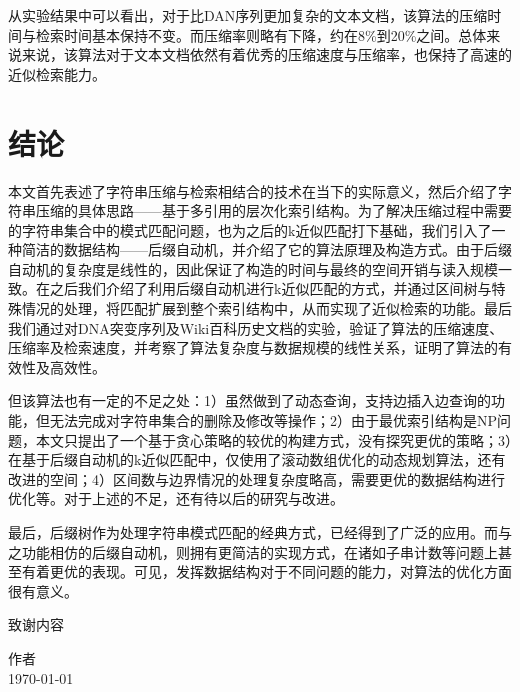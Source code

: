 ﻿\documentclass{sysuthesis}
\begin{document}
从实验结果中可以看出，对于比DAN序列更加复杂的文本文档，该算法的压缩时间与检索时间基本保持不变。而压缩率则略有下降，约在8\%到20\%之间。总体来说来说，该算法对于文本文档依然有着优秀的压缩速度与压缩率，也保持了高速的近似检索能力。



\chapter{结论}
本文首先表述了字符串压缩与检索相结合的技术在当下的实际意义，然后介绍了字符串压缩的具体思路——基于多引用的层次化索引结构。为了解决压缩过程中需要的字符串集合中的模式匹配问题，也为之后的k近似匹配打下基础，我们引入了一种简洁的数据结构——后缀自动机，并介绍了它的算法原理及构造方式。由于后缀自动机的复杂度是线性的，因此保证了构造的时间与最终的空间开销与读入规模一致。在之后我们介绍了利用后缀自动机进行k近似匹配的方式，并通过区间树与特殊情况的处理，将匹配扩展到整个索引结构中，从而实现了近似检索的功能。最后我们通过对DNA突变序列及Wiki百科历史文档的实验，验证了算法的压缩速度、压缩率及检索速度，并考察了算法复杂度与数据规模的线性关系，证明了算法的有效性及高效性。\par
但该算法也有一定的不足之处：1）虽然做到了动态查询，支持边插入边查询的功能，但无法完成对字符串集合的删除及修改等操作；2）由于最优索引结构是NP问题，本文只提出了一个基于贪心策略的较优的构建方式，没有探究更优的策略；3）在基于后缀自动机的k近似匹配中，仅使用了滚动数组优化的动态规划算法，还有改进的空间；4）区间数与边界情况的处理复杂度略高，需要更优的数据结构进行优化等。对于上述的不足，还有待以后的研究与改进。\par
最后，后缀树作为处理字符串模式匹配的经典方式，已经得到了广泛的应用。而与之功能相仿的后缀自动机，则拥有更简洁的实现方式，在诸如子串计数等问题上甚至有着更优的表现。可见，发挥数据结构对于不同问题的能力，对算法的优化方面很有意义。



\songti



\appendix

\begin{thankto}

	\songti{}
	致谢内容

	\vskip 18pt
	\begin{flushright}
		作者\\
		\today
	\end{flushright}
\end{thankto}

\backmatter
\end{document}
